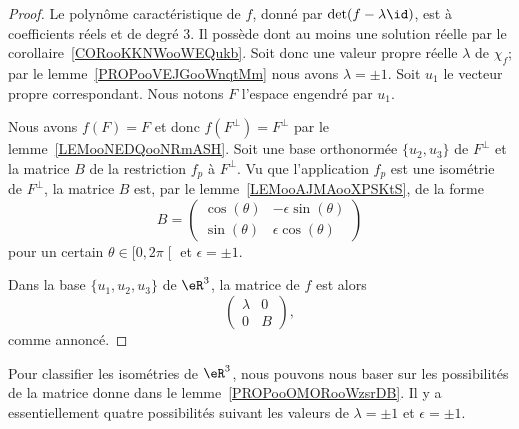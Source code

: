 \begin{proof}
    Le polynôme caractéristique de \( f\), donné par \( \det(f-\lambda\id)\), est à coefficients réels et de degré \( 3\). Il possède dont au moins une solution réelle par le corollaire~\ref{CORooKKNWooWEQukb}. Soit donc une valeur propre réelle \( \lambda\) de \( \chi_f\); par le lemme~\ref{PROPooVEJGooWnqtMm} nous avons \( \lambda=\pm 1\). Soit \( u_1\) le vecteur propre correspondant. Nous notons \( F\) l'espace engendré par \( u_1\).

    Nous avons \( f(F)=F\) et donc \( f(F^{\perp})=F^{\perp}\) par le lemme~\ref{LEMooNEDQooNRmASH}. Soit une base orthonormée \( \{ u_2,u_3 \}\) de \( F^{\perp}\) et la matrice \( B\) de la restriction \( f_{p}\) à \( F^{\perp}\). Vu que l'application \( f_p\) est une isométrie de \( F^{\perp}\), la matrice \( B\) est, par le lemme~\ref{LEMooAJMAooXPSKtS}, de la forme
    \begin{equation}
        B=\begin{pmatrix}
            \cos(\theta)    &   -\epsilon\sin(\theta)    \\
            \sin(\theta)    &   \epsilon\cos(\theta)
        \end{pmatrix}
    \end{equation}
    pour un certain \( \theta\in\mathopen[ 0 , 2\pi \mathclose[\) et \( \epsilon=\pm 1\).

    Dans la base \( \{u_1,u_2,u_3\}\) de \( \eR^3\), la matrice de \( f\) est alors
    \begin{equation}
        \begin{pmatrix}
            \lambda    &   0    \\
            0    &   B
        \end{pmatrix},
    \end{equation}
    comme annoncé.
\end{proof}

Pour classifier les isométries de \( \eR^3\), nous pouvons nous baser sur les possibilités de la matrice donne dans le lemme~\ref{PROPooOMORooWzsrDB}. Il y a essentiellement quatre possibilités suivant les valeurs de \( \lambda=\pm 1\) et \( \epsilon=\pm 1\).

